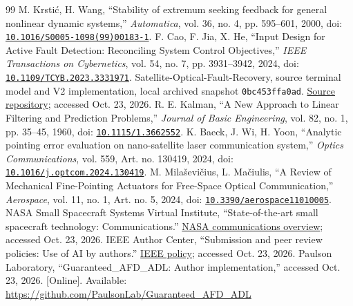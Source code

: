 \begin{thebibliography}{99}
 M. Krstić, H. Wang, ``Stability of extremum seeking feedback for general nonlinear dynamic systems,'' \emph{Automatica}, vol. 36, no. 4, pp. 595--601, 2000, doi: \href{https://doi.org/10.1016/S0005-1098(99)00183-1}{\nolinkurl{10.1016/S0005-1098(99)00183-1}}.
 F. Cao, F. Jia, X. He, ``Input Design for Active Fault Detection: Reconciling System Control Objectives,'' \emph{IEEE Transactions on Cybernetics}, vol. 54, no. 7, pp. 3931--3942, 2024, doi: \href{https://doi.org/10.1109/TCYB.2023.3331971}{\nolinkurl{10.1109/TCYB.2023.3331971}}.
 Satellite-Optical-Fault-Recovery, source terminal model and V2 implementation, local archived snapshot \texttt{0bc453ffa0ad}. \href{https://github.com/kaushalrog/Satellite-Optical-Fault-Recovery}{Source repository}; accessed Oct. 23, 2026.
 R. E. Kalman, ``A New Approach to Linear Filtering and Prediction Problems,'' \emph{Journal of Basic Engineering}, vol. 82, no. 1, pp. 35--45, 1960, doi: \href{https://doi.org/10.1115/1.3662552}{\nolinkurl{10.1115/1.3662552}}.
 K. Baeck, J. Wi, H. Yoon, ``Analytic pointing error evaluation on nano-satellite laser communication system,'' \emph{Optics Communications}, vol. 559, Art. no. 130419, 2024, doi: \href{https://doi.org/10.1016/j.optcom.2024.130419}{\nolinkurl{10.1016/j.optcom.2024.130419}}.
 M. Milaševičius, L. Mačiulis, ``A Review of Mechanical Fine-Pointing Actuators for Free-Space Optical Communication,'' \emph{Aerospace}, vol. 11, no. 1, Art. no. 5, 2024, doi: \href{https://doi.org/10.3390/aerospace11010005}{\nolinkurl{10.3390/aerospace11010005}}.
 NASA Small Spacecraft Systems Virtual Institute, ``State-of-the-art small spacecraft technology: Communications.'' \href{https://www.nasa.gov/smallsat-institute/sst-soa/soa-communications/}{NASA communications overview}; accessed Oct. 23, 2026.
 IEEE Author Center, ``Submission and peer review policies: Use of AI by authors.'' \href{https://journals.ieeeauthorcenter.ieee.org/become-an-ieee-journal-author/publishing-ethics/guidelines-and-policies/submission-and-peer-review-policies/}{IEEE policy}; accessed Oct. 23, 2026.
 Paulson Laboratory, ``Guaranteed\_AFD\_ADL: Author implementation,'' accessed Oct. 23, 2026. [Online]. Available: \url{https://github.com/PaulsonLab/Guaranteed_AFD_ADL}
\end{thebibliography}
